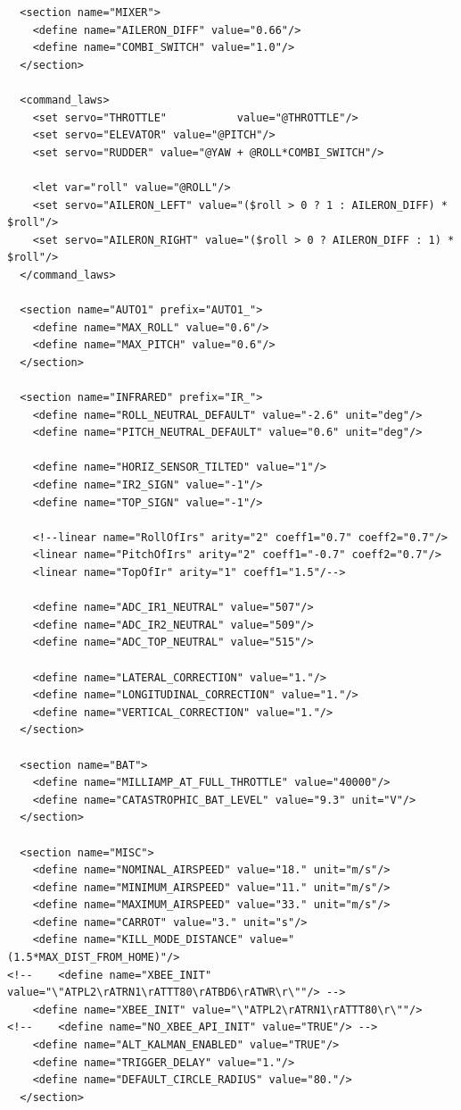 \documentclass[a4paper,11pt]{report}
\begin{document}
\begin{lstlisting}
  <section name="MIXER">
    <define name="AILERON_DIFF" value="0.66"/>
    <define name="COMBI_SWITCH" value="1.0"/>
  </section>

  <command_laws>
    <set servo="THROTTLE"           value="@THROTTLE"/>
    <set servo="ELEVATOR" value="@PITCH"/>
    <set servo="RUDDER" value="@YAW + @ROLL*COMBI_SWITCH"/>

    <let var="roll" value="@ROLL"/>
    <set servo="AILERON_LEFT" value="($roll > 0 ? 1 : AILERON_DIFF) * $roll"/>
    <set servo="AILERON_RIGHT" value="($roll > 0 ? AILERON_DIFF : 1) * $roll"/>
  </command_laws>

  <section name="AUTO1" prefix="AUTO1_">
    <define name="MAX_ROLL" value="0.6"/>
    <define name="MAX_PITCH" value="0.6"/>
  </section>

  <section name="INFRARED" prefix="IR_">
    <define name="ROLL_NEUTRAL_DEFAULT" value="-2.6" unit="deg"/>
    <define name="PITCH_NEUTRAL_DEFAULT" value="0.6" unit="deg"/>

    <define name="HORIZ_SENSOR_TILTED" value="1"/>
    <define name="IR2_SIGN" value="-1"/>
    <define name="TOP_SIGN" value="-1"/>

    <!--linear name="RollOfIrs" arity="2" coeff1="0.7" coeff2="0.7"/>
    <linear name="PitchOfIrs" arity="2" coeff1="-0.7" coeff2="0.7"/>
    <linear name="TopOfIr" arity="1" coeff1="1.5"/-->

    <define name="ADC_IR1_NEUTRAL" value="507"/>
    <define name="ADC_IR2_NEUTRAL" value="509"/>
    <define name="ADC_TOP_NEUTRAL" value="515"/>

    <define name="LATERAL_CORRECTION" value="1."/>
    <define name="LONGITUDINAL_CORRECTION" value="1."/>
    <define name="VERTICAL_CORRECTION" value="1."/>
  </section>

  <section name="BAT">
    <define name="MILLIAMP_AT_FULL_THROTTLE" value="40000"/>
    <define name="CATASTROPHIC_BAT_LEVEL" value="9.3" unit="V"/>
  </section>

  <section name="MISC">
    <define name="NOMINAL_AIRSPEED" value="18." unit="m/s"/>
    <define name="MINIMUM_AIRSPEED" value="11." unit="m/s"/>
    <define name="MAXIMUM_AIRSPEED" value="33." unit="m/s"/>
    <define name="CARROT" value="3." unit="s"/>
    <define name="KILL_MODE_DISTANCE" value="(1.5*MAX_DIST_FROM_HOME)"/>
<!--    <define name="XBEE_INIT" value="\"ATPL2\rATRN1\rATTT80\rATBD6\rATWR\r\""/> -->
    <define name="XBEE_INIT" value="\"ATPL2\rATRN1\rATTT80\r\""/>
<!--    <define name="NO_XBEE_API_INIT" value="TRUE"/> -->
    <define name="ALT_KALMAN_ENABLED" value="TRUE"/>
    <define name="TRIGGER_DELAY" value="1."/>
    <define name="DEFAULT_CIRCLE_RADIUS" value="80."/>
  </section>


\end{lstlisting}
\end{document}
